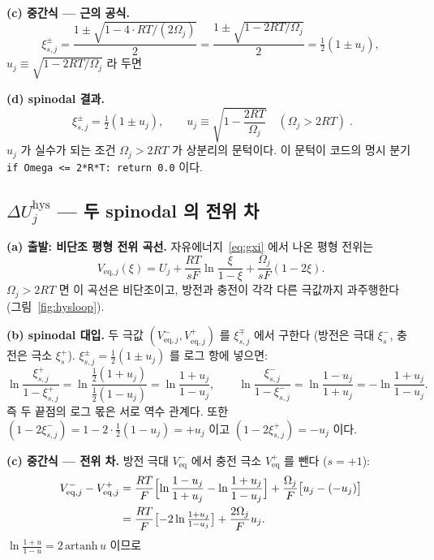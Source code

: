 \documentclass[11pt,a4paper]{article}
\newcommand{\eq}{\mathrm{eq}}
\newcommand{\hys}{\mathrm{hys}}
\newcommand{\code}[1]{\texttt{#1}}
\begin{document}
\textbf{(c) 중간식 — 근의 공식.}
\begin{equation}
\xi_{s,j}^\pm = \frac{1 \pm \sqrt{1 - 4\cdot RT/(2\Omega_j)}}{2}
= \frac{1 \pm \sqrt{1 - 2RT/\Omega_j}}{2}
= \tfrac12(1\pm u_j),
\label{eq:spinodalderiv}
\end{equation}
$u_j \equiv \sqrt{1-2RT/\Omega_j}$ 라 두면

\textbf{(d) spinodal 결과.}
\begin{equation}
\boxed{\;\xi_{s,j}^\pm=\tfrac12(1\pm u_j),\qquad
u_j\equiv\sqrt{1-\frac{2RT}{\Omega_j}}\quad(\Omega_j>2RT)\;.}
\label{eq:spinodal}
\end{equation}
$u_j$ 가 실수가 되는 조건 $\Omega_j>2RT$ 가 상분리의 문턱이다. 이 문턱이 코드의 명시 분기
\code{if Omega <= 2*R*T: return 0.0} 이다.

\subsection{$\Delta U_j^\hys$ — 두 spinodal 의 전위 차}

\textbf{(a) 출발: 비단조 평형 전위 곡선.} 자유에너지~\eqref{eq:gxi} 에서 나온 평형 전위는
\begin{equation}
V_{\eq,j}(\xi) = U_j + \frac{RT}{sF}\ln\frac{\xi}{1-\xi} + \frac{\Omega_j}{sF}(1-2\xi).
\label{eq:Veq}
\end{equation}
$\Omega_j>2RT$ 면 이 곡선은 비단조이고, 방전과 충전이 각각 다른 극값까지 과주행한다
(그림~\ref{fig:hysloop}).

\textbf{(b) spinodal 대입.} 두 극값 $(V_{\eq,j}^-, V_{\eq,j}^+)$ 를 $\xi_{s,j}^\mp$ 에서 구한다
(방전은 극대 $\xi_s^-$, 충전은 극소 $\xi_s^+$).
$\xi_{s,j}^\pm = \tfrac12(1\pm u_j)$ 를 로그 항에 넣으면:
\begin{equation}
\ln\frac{\xi_{s,j}^+}{1-\xi_{s,j}^+}
= \ln\frac{\tfrac12(1+u_j)}{\tfrac12(1-u_j)}
= \ln\frac{1+u_j}{1-u_j},
\qquad
\ln\frac{\xi_{s,j}^-}{1-\xi_{s,j}^-}
= \ln\frac{1-u_j}{1+u_j} = -\ln\frac{1+u_j}{1-u_j}.
\label{eq:logitspinodal}
\end{equation}
즉 두 끝점의 로그 몫은 서로 역수 관계다. 또한
$(1-2\xi_{s,j}^-) = 1-2\cdot\tfrac12(1-u_j) = +u_j$ 이고
$(1-2\xi_{s,j}^+) = -u_j$ 이다.

\textbf{(c) 중간식 — 전위 차.} 방전 극대 $V_{\eq}^-$ 에서 충전 극소 $V_{\eq}^+$ 를 뺀다
($s=+1$):
\begin{align}
V_{\eq,j}^- - V_{\eq,j}^+
&= \frac{RT}{F}\Bigl[\ln\frac{1-u_j}{1+u_j} - \ln\frac{1+u_j}{1-u_j}\Bigr]
+ \frac{\Omega_j}{F}\bigl[u_j - (-u_j)\bigr] \notag\\
&= \frac{RT}{F}\bigl[-2\ln\tfrac{1+u_j}{1-u_j}\bigr] + \frac{2\Omega_j}{F}u_j.
\label{eq:Vdiff}
\end{align}
$\ln\tfrac{1+u}{1-u} = 2\,\mathrm{artanh}\,u$ 이므로
\end{document}
